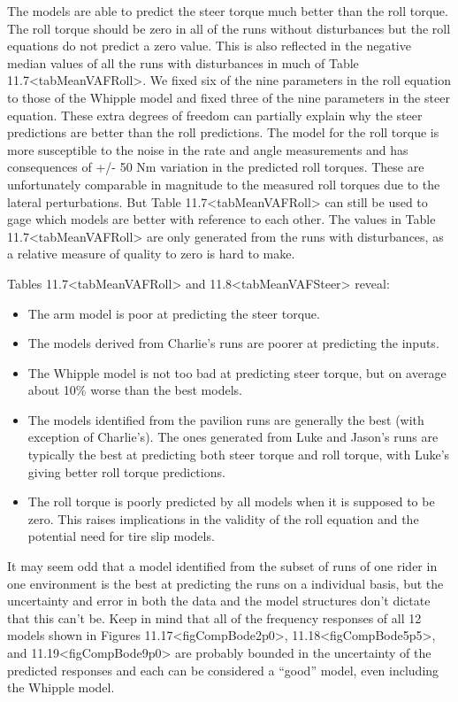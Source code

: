 \documentclass[a4paper]{article}
\begin{document}
The models are able to predict the steer torque much better than the
roll torque. The roll torque should be zero in all of the runs without
disturbances but the roll equations do not predict a zero value. This is
also reflected in the negative median values of all the runs with
disturbances in much of
Table 11.7\textless{}tabMeanVAFRoll\textgreater{}. We fixed six of the
nine parameters in the roll equation to those of the Whipple model and
fixed three of the nine parameters in the steer equation. These extra
degrees of freedom can partially explain why the steer predictions are
better than the roll predictions. The model for the roll torque is more
susceptible to the noise in the rate and angle measurements and has
consequences of +/- 50 Nm variation in the predicted roll torques. These
are unfortunately comparable in magnitude to the measured roll torques
due to the lateral perturbations. But Table
11.7\textless{}tabMeanVAFRoll\textgreater{} can still be used to gage
which models are better with reference to each other. The values in
Table 11.7\textless{}tabMeanVAFRoll\textgreater{} are only generated
from the runs with disturbances, as a relative measure of quality to
zero is hard to make.

Tables 11.7\textless{}tabMeanVAFRoll\textgreater{} and
11.8\textless{}tabMeanVAFSteer\textgreater{} reveal:

\begin{itemize}
  \item
    The arm model is poor at predicting the steer torque.
  \item
    The models derived from Charlie's runs are poorer at predicting the
    inputs.
  \item
    The Whipple model is not too bad at predicting steer torque, but on
    average about 10\% worse than the best models.
  \item
    The models identified from the pavilion runs are generally the best
    (with exception of Charlie's). The ones generated from Luke and
    Jason's runs are typically the best at predicting both steer torque
    and roll torque, with Luke's giving better roll torque predictions.
  \item
    The roll torque is poorly predicted by all models when it is supposed
    to be zero. This raises implications in the validity of the roll
    equation and the potential need for tire slip models.
\end{itemize}

It may seem odd that a model identified from the subset of runs of one
rider in one environment is the best at predicting the runs on a
individual basis, but the uncertainty and error in both the data and the
model structures don't dictate that this can't be. Keep in mind that all
of the frequency responses of all 12 models shown in Figures
11.17\textless{}figCompBode2p0\textgreater{},
11.18\textless{}figCompBode5p5\textgreater{}, and
11.19\textless{}figCompBode9p0\textgreater{} are probably bounded in the
uncertainty of the predicted responses and each can be considered a
``good'' model, even including the Whipple model.
\end{document}
